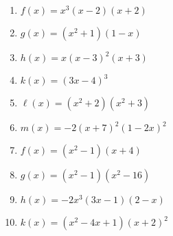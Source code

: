 \documentclass[12pt]{article}
\theoremstyle{definition}
\begin{document}
\begin{multicols}{2}
\begin{enumerate}
  \item $f(x)=x^3(x-2)(x+2)$
	\item $g(x)=(x^2+1)(1-x)$
	\item $h(x)=x(x-3)^2(x+3)$
	\item $k(x)=(3x-4)^3$
  \item $\ell(x)=(x^2+2)(x^2+3)$
  \item $m(x)=-2(x+7)^2(1-2x)^2$
  \item $f(x)=(x^2-1)(x+4)$
	\item $g(x)=(x^2-1)(x^2-16)$
	\item $h(x)=-2x^3(3x-1)(2-x)$
	\item $k(x)=(x^2-4x+1)(x+2)^2$
\end{enumerate}
\end{multicols}
\newpage
\end{document}

